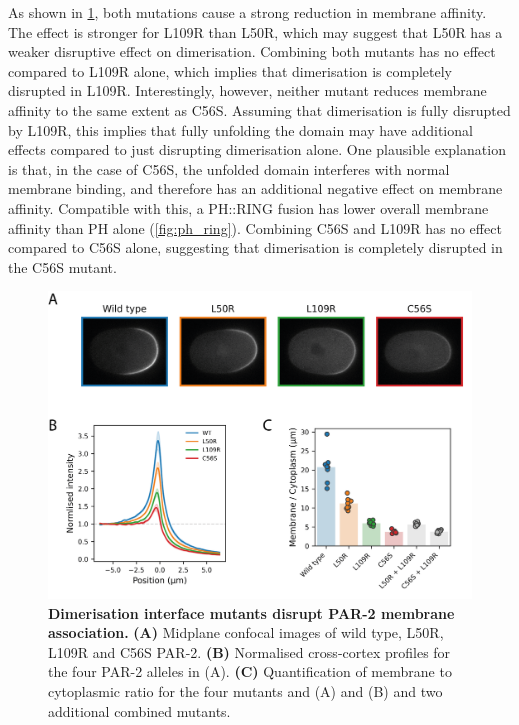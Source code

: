 \documentclass[12pt]{"report"}
\newcommand{\mycaption}[2]{\caption[#1]{\textbf{#1.} #2}}
\begin{document}
As shown in \cref{fig:dimer_interface_mutants_in_vivo}, both mutations cause a strong reduction in membrane affinity. The effect is stronger for L109R than L50R, which may suggest that L50R has a weaker disruptive effect on dimerisation. Combining both mutants has no effect compared to L109R alone, which implies that dimerisation is completely disrupted in L109R. Interestingly, however, neither mutant reduces membrane affinity to the same extent as C56S. Assuming that dimerisation is fully disrupted by L109R, this implies that fully unfolding the domain may have additional effects compared to just disrupting dimerisation alone. One plausible explanation is that, in the case of C56S, the unfolded domain interferes with normal membrane binding, and therefore has an additional negative effect on membrane affinity. Compatible with this, a PH::RING fusion has lower overall membrane affinity than PH alone (\cref{fig:ph_ring}). Combining C56S and L109R has no effect compared to C56S alone, suggesting that dimerisation is completely disrupted in the C56S mutant.\\

\begin{figure}
\includegraphics[scale=0.9]{dimer_interface_mutants_in_vivo}
\centering
\mycaption{Dimerisation interface mutants disrupt PAR-2 membrane association}{
\textbf{(A)} Midplane confocal images of wild type, L50R, L109R and C56S PAR-2.
\textbf{(B)} Normalised cross-cortex profiles for the four PAR-2 alleles in (A).
\textbf{(C)} Quantification of membrane to cytoplasmic ratio for the four mutants and (A) and (B) and two additional combined mutants.
}
\label{fig:dimer_interface_mutants_in_vivo}
\end{figure}
\end{document}
